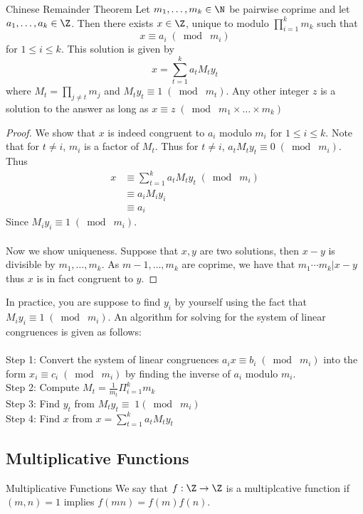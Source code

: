 \begin{thm}{Chinese Remainder Theorem}{} Let $m_1,\dots,m_k\in\N$ be pairwise coprime and let $a_1,\dots,a_k\in\Z$. Then there exists $x\in\Z$, unique to modulo $\prod_{i=1}^km_k$ such that $$x\equiv a_i\;(\bmod\; m_i)$$ for $1\leq i\leq k$. This solution is given by $$x=\sum_{t=1}^ka_tM_ty_t$$ where $M_t=\prod_{j\neq t}m_j$ and $M_ty_t\equiv1\;(\bmod\; m_t)$. Any other integer $z$ is a solution to the answer as long as $x\equiv z\;(\bmod\; m_1\times\dots\times m_k)$\tcbline
\begin{proof}
We show that $x$ is indeed congruent to $a_i$ modulo $m_i$ for $1\leq i\leq k$. Note that for $t\neq i$, $m_i$ is a factor of $M_t$. Thus for $t\neq i$, $a_tM_ty_t\equiv0\;(\bmod\; m_i)$. Thus
\begin{align*}
x&\equiv\sum_{t=1}^ka_tM_ty_t\;(\bmod\; m_i)\\
&\equiv a_iM_iy_i\\
&\equiv a_i
\end{align*}
Since $M_iy_i\equiv 1\;(\bmod\; m_i)$. \\~\\
Now we show uniqueness. Suppose that $x,y$ are two solutions, then $x-y$ is divisible by $m_1,\dots,m_k$. As $m-1,\dots,m_k$ are coprime, we have that $m_1\cdots m_k|x-y$ thus $x$ is in fact congruent to $y$. 
\end{proof}
\end{thm}

In practice, you are suppose to find $y_i$ by yourself using the fact that $M_iy_i\equiv 1\;(\bmod\; m_i)$. An algorithm for solving for the system of linear congruences is given as follows: \\~\\
Step 1: Convert the system of linear congruences $a_ix\equiv b_i\;(\bmod\; m_i)$ into the form $x_i\equiv c_i\;(\bmod\; m_i)$ by finding the inverse of $a_i$ modulo $m_i$. \\
Step 2: Compute $M_t=\frac{1}{m_t}\Pi_{i=1}^km_k$\\
Step 3: Find $y_t$ from $M_ty_t\equiv\;1(\bmod\; m_i)$\\
Step 4: Find $x$ from $x=\sum_{t=1}^ka_tM_ty_t$

\subsection{Multiplicative Functions}
\begin{defn}{Multiplicative Functions}{} We say that $f:\Z\to\Z$ is a multiplcative function if $(m,n)=1$ implies $f(mn)=f(m)f(n)$. 
\end{defn}

